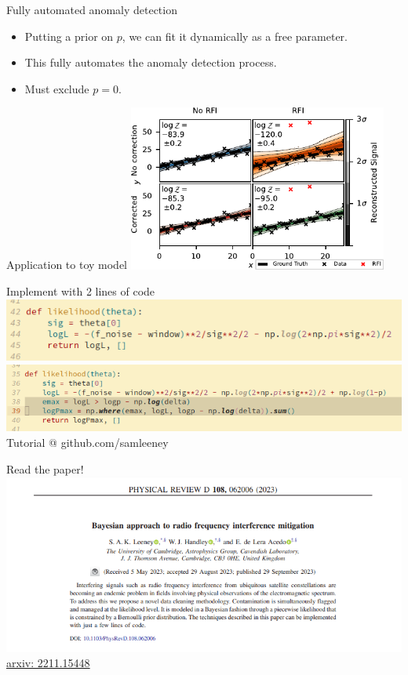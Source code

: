 \documentclass[aspectratio=169]{beamer}
\begin{document}
\begin{frame}{Fully automated anomaly detection}
  \begin{itemize}
  \item Putting a prior on $p$, we can fit it dynamically as a free parameter.
  \item This fully automates the anomaly detection process.
  \item Must exclude $p=0$.
  \end{itemize}
\end{frame}

\begin{frame}{Application to toy model}
  \centering
  \includegraphics[width=0.64\textwidth]{images/4pane_toy_sidebar.pdf}
\end{frame}

\begin{frame}{Implement with 2 lines of code}
  \includegraphics[width=1\textwidth]{images/logl1.png}
  \includegraphics[width=1\textwidth]{images/logl2.png}
  \centering Tutorial @ github.com/samleeney
\end{frame}

\begin{frame}{Read the paper!}
  \includegraphics[width=1\textwidth]{images/paper1.png}
  \href{https://arxiv.org/abs/2211.15448}{arxiv: 2211.15448}
\end{frame}
\end{document}
